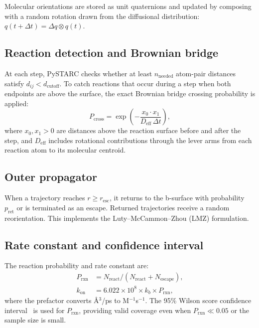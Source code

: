 \documentclass[journal=jctcce,manuscript=article,layout=twocolumn]{achemso}
\newcommand{\kon}{k_{\mathrm{on}}}
\newcommand{\Prxn}{P_{\mathrm{rxn}}}
\begin{document}
Molecular orientations are stored as unit quaternions and updated
by composing with a random rotation drawn from the diffusional
distribution: $q(t{+}\Delta t) = \Delta q \otimes q(t)$.

\subsection{Reaction detection and Brownian bridge}

At each step, PySTARC checks whether at least $n_\mathrm{needed}$
atom-pair distances satisfy $d_{ij} < d_\mathrm{cutoff}$.
To catch reactions that occur during a step when both endpoints
are above the surface, the exact Brownian bridge crossing
probability is applied:~\cite{Anderson1960}
\begin{equation}
P_\mathrm{cross} = \exp\!\left(
  -\frac{x_0 \cdot x_1}{D_\mathrm{eff}\,\Delta t}\right),
\label{eq:bb}
\end{equation}
where $x_0, x_1 > 0$ are distances above the reaction surface
before and after the step, and $D_\mathrm{eff}$ includes
rotational contributions through the lever arms from each
reaction atom to its molecular centroid.

\subsection{Outer propagator}

When a trajectory reaches $r \ge r_\mathrm{esc}$, it returns to
the b-surface with probability $p_\mathrm{ret}$ or is terminated
as an escape.
Returned trajectories receive a random reorientation.
This implements the Luty--McCammon--Zhou (LMZ)
formulation.~\cite{Luty1992,Zhou1998}

\subsection{Rate constant and confidence interval}

The reaction probability and rate constant are:
\begin{align}
\Prxn &= N_\mathrm{react}/(N_\mathrm{react} + N_\mathrm{escape}),
\label{eq:Prxn}\\
\kon &= 6.022 \times 10^{8} \times k_b \times \Prxn,
\label{eq:kon}
\end{align}
where the prefactor converts \AA$^3$/ps to M$^{-1}$s$^{-1}$.
The 95\% Wilson score confidence interval~\cite{Wilson1927} is used
for $\Prxn$, providing valid coverage even when $\Prxn \ll 0.05$
or the sample size is small.
\end{document}
